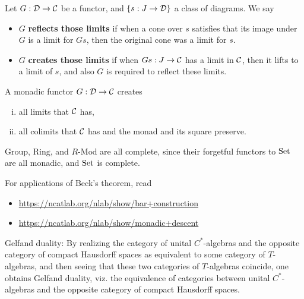 \documentclass[12pt]{article}
\newcommand{\LMod}{\text{-}\mathrm{Mod}}
\newcommand{\Group}{\mathrm{Group}}
\newcommand{\Ring}{\mathrm{Ring}}
\begin{document}
\begin{defn}
    Let $G: \mathcal{D}\to \mathcal{C}$ be a functor, and $\{s: J \to \mathcal{D}\}$ a class of diagrams. We say
    \begin{itemize}
        \item $G$ \textbf{reflects those limits} if when a cone over $s$ satisfies that its image under $G$ is a limit for $Gs$, then the original cone was a limit for $s$.
        \item $G$ \textbf{creates those limits} if when $Gs: J\to \mathcal{C}$ has a limit in $\mathcal{C}$, then it lifts to a limit of $s$, and also $G$ is required to reflect these limits.
    \end{itemize}
\end{defn}

\begin{prop}\label{create-limits}
    A monadic functor $G: \mathcal{D} \to \mathcal{C}$ creates
    \begin{enumerate}[(i)]
        \item all limits that $\mathcal{C}$ has,
        \item all colimits that $\mathcal{C}$ has and the monad and its square preserve.
    \end{enumerate}
\end{prop}

\begin{eg}
    $\Group$, $\Ring$, and $R\LMod$ are all complete, since their forgetful functors to $\mathrm{Set}$ are all monadic, and $\mathrm{Set}$ is complete.
\end{eg}

For applications of Beck's theorem, read

\begin{itemize}
    \item \url{https://ncatlab.org/nlab/show/bar+construction}
    \item \url{https://ncatlab.org/nlab/show/monadic+descent}
\end{itemize}

\begin{eg}
    Gelfand duality: By realizing the category of unital $C^*$-algebras and the opposite category of compact Hausdorff spaces as equivalent to some category of $T$-algebras, and then seeing that these two categories of $T$-algebras coincide, one obtains Gelfand duality, viz. the equivalence of categories between unital $C^*$-algebras and the opposite category of compact Hausdorff spaces.
\end{eg}
\end{document}

